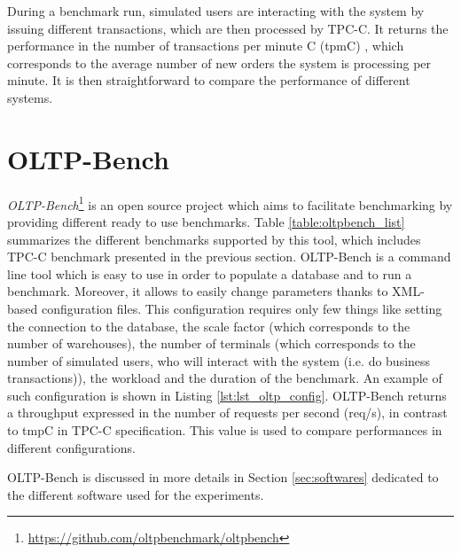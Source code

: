 During a benchmark run, simulated users are interacting with the system by issuing different transactions, which are then processed by TPC-C.
It returns the performance in the number of transactions per minute C (tpmC) , which corresponds to the average number of new orders the system is processing per minute.
It is then straightforward to compare the performance of different systems.



\section{OLTP-Bench}
\textit{OLTP-Bench}\footnote{\url{https://github.com/oltpbenchmark/oltpbench}} is an open source project which aims to facilitate benchmarking by providing different ready to use benchmarks. 
Table \ref{table:oltpbench_list} summarizes the different benchmarks supported by this tool, which includes TPC-C benchmark presented in the previous section.
OLTP-Bench is a command line tool which is easy to use in order to populate a database and to run a benchmark.
Moreover, it allows to easily change parameters thanks to XML-based configuration files.
This configuration requires only few things like setting the connection to the database, the scale factor (which corresponds to the number of warehouses), the number of terminals (which corresponds to the number of simulated users, who will interact with the system (i.e. do business transactions)), the workload and the duration of the benchmark.
An example of such configuration is shown in Listing \ref{lst:lst_oltp_config}.
OLTP-Bench returns a throughput expressed in the number of requests per second (req/s), in contrast to tmpC in TPC-C specification.
This value is used to compare performances in different configurations.

OLTP-Bench is discussed in more details in Section \ref{sec:softwares} dedicated to the different software used for the experiments.

